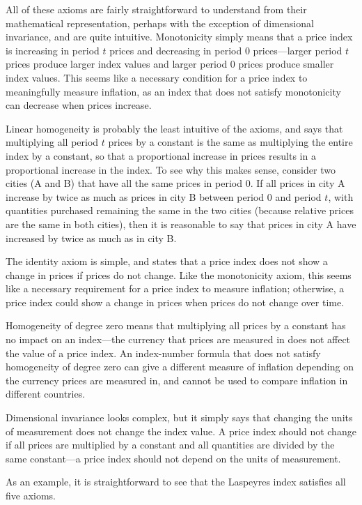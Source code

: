 \documentclass[]{article}
\begin{document}
All of these axioms are fairly straightforward to understand from their mathematical representation, perhaps with the exception of dimensional invariance, and are quite intuitive. Monotonicity simply means that a price index is increasing in period \(t\) prices and decreasing in period 0 prices---larger period \(t\) prices produce larger index values and larger period 0 prices produce smaller index values. This seems like a necessary condition for a price index to meaningfully measure inflation, as an index that does not satisfy monotonicity can decrease when prices increase.

Linear homogeneity is probably the least intuitive of the axioms, and says that multiplying all period \(t\) prices by a constant is the same as multiplying the entire index by a constant, so that a proportional increase in prices results in a proportional increase in the index. To see why this makes sense, consider two cities (A and B) that have all the same prices in period 0. If all prices in city A increase by twice as much as prices in city B between period 0 and period \(t\), with quantities purchased remaining the same in the two cities (because relative prices are the same in both cities), then it is reasonable to say that prices in city A have increased by twice as much as in city B.

The identity axiom is simple, and states that a price index does not show a change in prices if prices do not change. Like the monotonicity axiom, this seems like a necessary requirement for a price index to measure inflation; otherwise, a price index could show a change in prices when prices do not change over time.

Homogeneity of degree zero means that multiplying all prices by a constant has no impact on an index---the currency that prices are measured in does not affect the value of a price index. An index-number formula that does not satisfy homogeneity of degree zero can give a different measure of inflation depending on the currency prices are measured in, and cannot be used to compare inflation in different countries.

Dimensional invariance looks complex, but it simply says that changing the units of measurement does not change the index value. A price index should not change if all prices are multiplied by a constant and all quantities are divided by the same constant---a price index should not depend on the units of measurement.

As an example, it is straightforward to see that the Laspeyres index satisfies all five axioms.
\end{document}

